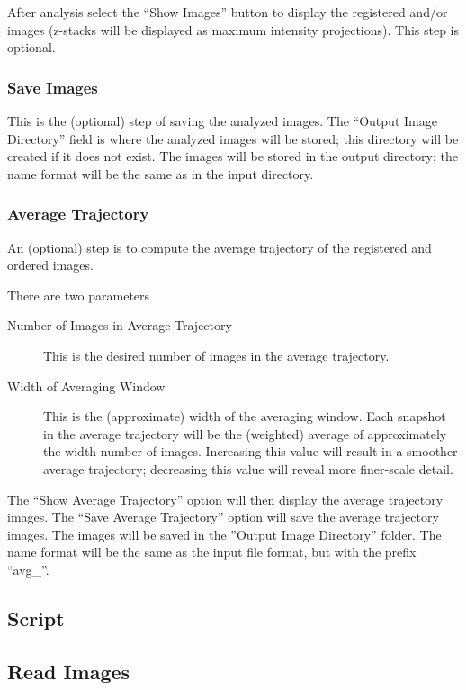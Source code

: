 \documentclass[12pt]{article}
\begin{document}
After analysis select the ``Show Images'' button to display the registered and/or images (z-stacks will be displayed as maximum intensity projections). This step is optional.


\subsubsection{Save Images}

This is the (optional) step of saving the analyzed images.
%
The ``Output Image Directory'' field is where the analyzed images will be stored; this directory will be created if it does not exist. 
%
The images will be stored in the output directory; the name format will be the same as in the input directory. 

\subsubsection{Average Trajectory}

An (optional) step is to compute the average trajectory of the registered and ordered images.

There are two parameters
\begin{description}
\item[Number of Images in Average Trajectory] This is the desired number of images in the average trajectory. 
%
\item[Width of Averaging Window] This is the (approximate) width of the averaging window. Each snapshot in the average trajectory will be the (weighted) average of approximately the width number of images. Increasing this value will result in a smoother average trajectory; decreasing this value will reveal more finer-scale detail. 
% 
\end{description}

The ``Show Average Trajectory'' option will then display the average trajectory images. 
%
The ``Save Average Trajectory'' option will save the average trajectory images. 
%
The images will be saved in the ''Output Image Directory'' folder. 
%
The name format will be the same as the input file format, but with the prefix ``avg\_''.

\subsection{Script}

\subsection*{Read Images}
\end{document}
